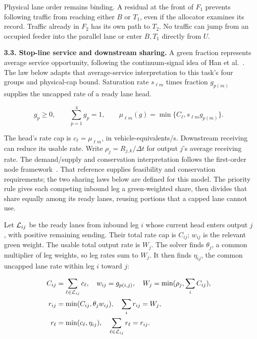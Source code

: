 \documentclass[10pt,a4paper]{article}
\newcommand{\rev}[1]{{\color{revisionred}#1}}
\begin{document}
Physical lane order remains binding. A residual at the front of $F_1$
prevents following traffic from reaching either $B$ or $T_1$, even if
the allocator examines its record. Traffic already in $F_2$ has its own
path to $T_2$. No traffic can jump from an occupied feeder into the
parallel lane or enter $B,T_1$ directly from $U$.


\textbf{3.3. Stop-line service and downstream sharing.}
A green fraction represents average service opportunity, following the
continuum-signal idea of Han et al.~\cite{han}.
\rev{The law below adapts that average-service interpretation to this task's four groups and physical-cap bound.}
Saturation rate $s_{\ell m}$ times fraction $g_{p(m)}$ supplies the
uncapped rate of a ready lane head.
\par
\begin{equation}
 g_p\geq0,\qquad \sum_{p=1}^4g_p=1,\qquad
 \mu_{\ell m}(g)=\min\{C_\ell,s_{\ell m}g_{p(m)}\}.
 \label{eq:compact-action}
\end{equation}

The head's rate cap is $c_\ell=\mu_{\ell m}$, in vehicle-equivalents/s.
Downstream receiving can reduce its usable rate. Write
$\rho_j=R_{j,k}/\Delta t$ for output $j$'s average receiving rate.
The demand/supply and conservation interpretation follows the first-order
node framework~\cite{node}.
\rev{That reference supplies feasibility and conservation requirements; the two sharing laws below are defined for this model.}
The priority rule gives
each competing inbound leg a green-weighted share, then divides that
share equally among its ready lanes, reusing portions that a capped lane
cannot use.

Let ${\cal L}_{ij}$ be the ready lanes from inbound leg $i$ whose current
head enters output $j$, with positive remaining sending. Their total rate
cap is $C_{ij}$; $w_{ij}$ is the relevant green weight. The usable total
output rate is $W_j$. The solver finds $\theta_j$, a common multiplier of
leg weights, so leg rates sum to $W_j$. It then finds $\eta_{ij}$, the
common uncapped lane rate within leg $i$ toward $j$:
\par
\begin{align}
 C_{ij}&=\sum_{\ell\in{\cal L}_{ij}}c_\ell,\quad
 w_{ij}=g_{p(i,j)},\quad W_j=\min(\rho_j,\sum_iC_{ij}),\nonumber\\
 r_{ij}&=\min(C_{ij},\theta_jw_{ij}),\quad
                    \sum_i r_{ij}=W_j,\label{eq:compact-leg-sharing}\\
 r_\ell&=\min(c_\ell,\eta_{ij}),\quad
                    \sum_{\ell\in{\cal L}_{ij}}r_\ell=r_{ij}.
 \label{eq:compact-lane-sharing}
\end{align}
\end{document}
